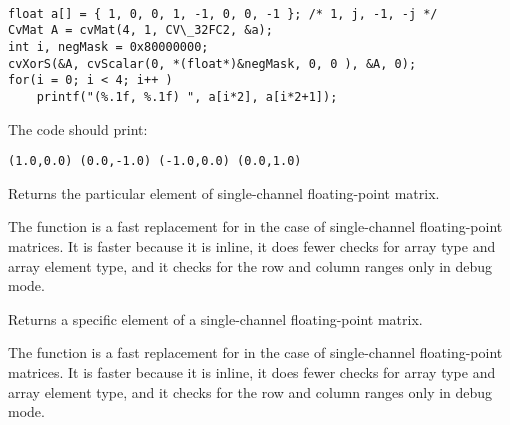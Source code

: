 \begin{lstlisting}

float a[] = { 1, 0, 0, 1, -1, 0, 0, -1 }; /* 1, j, -1, -j */
CvMat A = cvMat(4, 1, CV\_32FC2, &a);
int i, negMask = 0x80000000;
cvXorS(&A, cvScalar(0, *(float*)&negMask, 0, 0 ), &A, 0);
for(i = 0; i < 4; i++ )
    printf("(%.1f, %.1f) ", a[i*2], a[i*2+1]);

\end{lstlisting}

The code should print:

\begin{lstlisting}
(1.0,0.0) (0.0,-1.0) (-1.0,0.0) (0.0,1.0)
\end{lstlisting}

Returns the particular element of single-channel floating-point matrix.


\begin{description}
\end{description}

The function is a fast replacement for 
in the case of single-channel floating-point matrices. It is faster because
it is inline, it does fewer checks for array type and array element type,
and it checks for the row and column ranges only in debug mode.

Returns a specific element of a single-channel floating-point matrix.


\begin{description}
\end{description}


The function is a fast replacement for 
in the case of single-channel floating-point matrices. It is faster because
it is inline, it does fewer checks for array type and array element type, 
and it checks for the row and column ranges only in debug mode.

\fi


